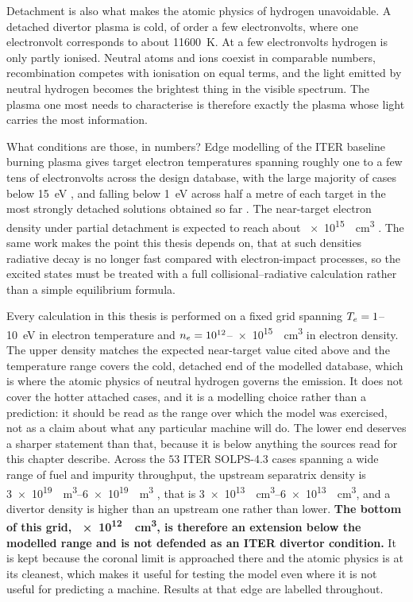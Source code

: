Detachment is also what makes the atomic physics of hydrogen unavoidable. A
detached divertor plasma is cold, of order a few electronvolts, where one
electronvolt corresponds to about \SI{11600}{\kelvin}. At a few electronvolts
hydrogen is only partly ionised. Neutral atoms and ions coexist in
comparable numbers, recombination competes with ionisation on equal terms, and
the light emitted by neutral hydrogen becomes the brightest thing in the visible
spectrum. The plasma one most needs to characterise is therefore exactly the
plasma whose light carries the most information.

What conditions are those, in numbers? Edge modelling of the ITER baseline
burning plasma gives target electron temperatures spanning roughly one to a few
tens of electronvolts across the design database, with the large majority of
cases below \SI{15}{\electronvolt} \cite{Stangeby2023}, and
falling below \SI{1}{\electronvolt} across half a metre of each target in the
most strongly detached solutions obtained so far \cite{Lore2022}. The near-target
electron density under partial detachment is expected to reach about
\SI{e15}{\per\cubic\centi\metre} \cite{Krasheninnikov2017}. The same work
makes the point this thesis depends on, that at such densities radiative decay is
no longer fast compared with electron-impact processes, so the excited states
must be treated with a full collisional--radiative calculation rather than a
simple equilibrium formula.

Every calculation in this thesis is performed on a fixed grid spanning
$T_e = 1$--\SI{10}{\electronvolt} in electron temperature and
$n_e = 10^{12}$--\SI{e15}{\per\cubic\centi\metre} in electron density. The
upper density matches the expected near-target value cited above and the
temperature range covers the cold, detached end of the modelled database, which
is where the atomic physics of neutral hydrogen governs the emission. It does not
cover the hotter attached cases, and it is a modelling choice rather than a
prediction: it should be read as the range over which the model was exercised,
not as a claim about what any particular machine will do.
The lower end deserves a sharper statement than that, because it is below
anything the sources read for this chapter describe. Across the $53$ ITER
SOLPS-4.3 cases spanning a wide range of fuel and impurity throughput, the
upstream separatrix density is
\SIrange{3e19}{6e19}{\per\cubic\metre} \cite[Sec.~3.1.1]{Pitts2019}, that is
\SIrange{3e13}{6e13}{\per\cubic\centi\metre}, and a divertor density is higher
than an upstream one rather than lower. \textbf{The bottom of this grid,
\SI{e12}{\per\cubic\centi\metre}, is therefore an extension below the modelled
range and is not defended as an ITER divertor condition.} It is kept because the
coronal limit is approached there and the atomic physics is at its cleanest,
which makes it useful for testing the model even where it is not useful for
predicting a machine. Results at that edge are labelled throughout.

